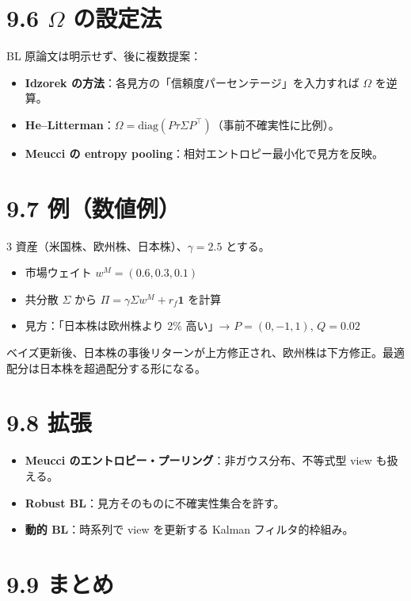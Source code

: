 \documentclass[11pt,a4paper]{report}
\begin{document}
\section{9.6 $\Omega$ の設定法}

BL 原論文は明示せず、後に複数提案：

\begin{itemize}
\item \textbf{Idzorek の方法}：各見方の「信頼度パーセンテージ」を入力すれば $\Omega$ を逆算。
\item \textbf{He–Litterman}：$\Omega = \mathrm{diag}(P \tau\Sigma P^\top)$（事前不確実性に比例）。
\item \textbf{Meucci の entropy pooling}：相対エントロピー最小化で見方を反映。
\end{itemize}

\section{9.7 例（数値例）}

3 資産（米国株、欧州株、日本株）、$\gamma = 2.5$ とする。
\begin{itemize}
\item 市場ウェイト $w^M = (0.6, 0.3, 0.1)$
\item 共分散 $\Sigma$ から $\Pi = \gamma\Sigma w^M + r_f\mathbf{1}$ を計算
\item 見方：「日本株は欧州株より 2\% 高い」→ $P = (0, -1, 1)$, $Q = 0.02$
\end{itemize}

ベイズ更新後、日本株の事後リターンが上方修正され、欧州株は下方修正。最適配分は日本株を超過配分する形になる。

\section{9.8 拡張}

\begin{itemize}
\item \textbf{Meucci のエントロピー・プーリング}：非ガウス分布、不等式型 view も扱える。
\item \textbf{Robust BL}：見方そのものに不確実性集合を許す。
\item \textbf{動的 BL}：時系列で view を更新する Kalman フィルタ的枠組み。
\end{itemize}

\section{9.9 まとめ}
\end{document}
